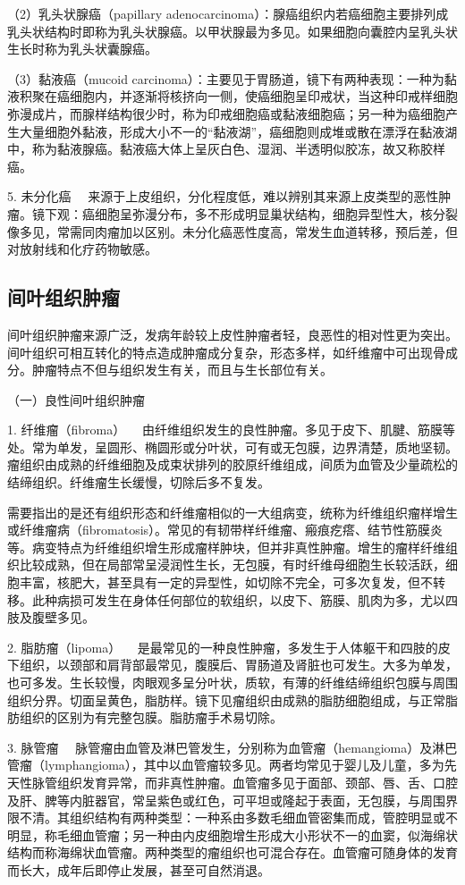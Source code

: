 （2）乳头状腺癌（papillary
adenocarcinoma）：腺癌组织内若癌细胞主要排列成乳头状结构时即称为乳头状腺癌。以甲状腺最为多见。如果细胞向囊腔内呈乳头状生长时称为乳头状囊腺癌。

（3）黏液癌（mucoid
carcinoma）：主要见于胃肠道，镜下有两种表现：一种为黏液积聚在癌细胞内，并逐渐将核挤向一侧，使癌细胞呈印戒状，当这种印戒样细胞弥漫成片，而腺样结构很少时，称为印戒细胞癌或黏液细胞癌；另一种为癌细胞产生大量细胞外黏液，形成大小不一的“黏液湖”，癌细胞则成堆或散在漂浮在黏液湖中，称为黏液腺癌。黏液癌大体上呈灰白色、湿润、半透明似胶冻，故又称胶样癌。

{5. 未分化癌}
　来源于上皮组织，分化程度低，难以辨别其来源上皮类型的恶性肿瘤。镜下观：癌细胞呈弥漫分布，多不形成明显巢状结构，细胞异型性大，核分裂像多见，常需同肉瘤加以区别。未分化癌恶性度高，常发生血道转移，预后差，但对放射线和化疗药物敏感。

\subsection{间叶组织肿瘤}

间叶组织肿瘤来源广泛，发病年龄较上皮性肿瘤者轻，良恶性的相对性更为突出。间叶组织可相互转化的特点造成肿瘤成分复杂，形态多样，如纤维瘤中可出现骨成分。肿瘤特点不但与组织发生有关，而且与生长部位有关。

{（一）良性间叶组织肿瘤}

{1. 纤维瘤（fibroma）}
　由纤维组织发生的良性肿瘤。多见于皮下、肌腱、筋膜等处。常为单发，呈圆形、椭圆形或分叶状，可有或无包膜，边界清楚，质地坚韧。瘤组织由成熟的纤维细胞及成束状排列的胶原纤维组成，间质为血管及少量疏松的结缔组织。纤维瘤生长缓慢，切除后多不复发。

需要指出的是还有组织形态和纤维瘤相似的一大组病变，统称为纤维组织瘤样增生或纤维瘤病（fibromatosis）。常见的有韧带样纤维瘤、瘢痕疙瘩、结节性筋膜炎等。病变特点为纤维组织增生形成瘤样肿块，但并非真性肿瘤。增生的瘤样纤维组织比较成熟，但在局部常呈浸润性生长，无包膜，有时纤维母细胞生长较活跃，细胞丰富，核肥大，甚至具有一定的异型性，如切除不完全，可多次复发，但不转移。此种病损可发生在身体任何部位的软组织，以皮下、筋膜、肌肉为多，尤以四肢及腹壁多见。

{2. 脂肪瘤（lipoma）}
　是最常见的一种良性肿瘤，多发生于人体躯干和四肢的皮下组织，以颈部和肩背部最常见，腹膜后、胃肠道及肾脏也可发生。大多为单发，也可多发。生长较慢，肉眼观多呈分叶状，质软，有薄的纤维结缔组织包膜与周围组织分界。切面呈黄色，脂肪样。镜下见瘤组织由成熟的脂肪细胞组成，与正常脂肪组织的区别为有完整包膜。脂肪瘤手术易切除。

{3. 脉管瘤}
　脉管瘤由血管及淋巴管发生，分别称为血管瘤（hemangioma）及淋巴管瘤（lymphangioma），其中以血管瘤较多见。两者均常见于婴儿及儿童，多为先天性脉管组织发育异常，而非真性肿瘤。血管瘤多见于面部、颈部、唇、舌、口腔及肝、脾等内脏器官，常呈紫色或红色，可平坦或隆起于表面，无包膜，与周围界限不清。其组织结构有两种类型：一种系由多数毛细血管密集而成，管腔明显或不明显，称毛细血管瘤；另一种由内皮细胞增生形成大小形状不一的血窦，似海绵状结构而称海绵状血管瘤。两种类型的瘤组织也可混合存在。血管瘤可随身体的发育而长大，成年后即停止发展，甚至可自然消退。

